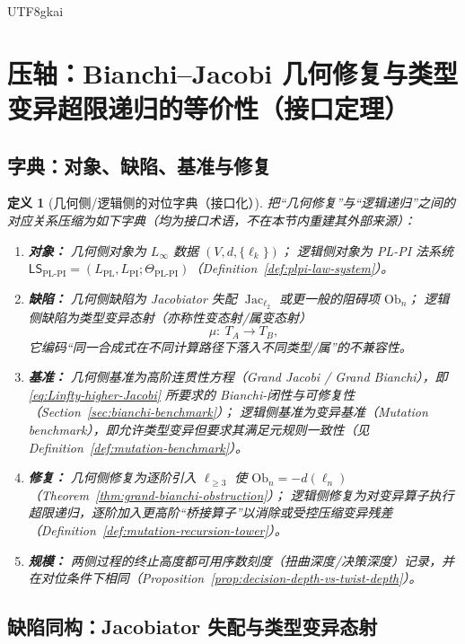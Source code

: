 \documentclass[12pt]{article}
\newtheorem{definition}{定义}[section]
\newcommand{\Layer}{\ensuremath{\ell}}
\newcommand{\Jac}{\operatorname{Jac}}
\newcommand{\Ob}{\mathrm{Ob}}
\newcommand{\LSPLPI}{\ensuremath{\mathsf{LS}_{\mathrm{PL\text{-}PI}}}}
\newcommand{\LPL}{\ensuremath{L_{\mathrm{PL}}}}
\newcommand{\LPI}{\ensuremath{L_{\mathrm{PI}}}}
\newcommand{\ThetaPLPI}{\ensuremath{\Theta_{\mathrm{PL\text{-}PI}}}}
\begin{document}
\begin{CJK*}{UTF8}{gkai}
\section{压轴：Bianchi--Jacobi 几何修复与类型变异超限递归的等价性（接口定理）}
\label{sec:bianchi-mutation-equivalence}

\subsection{字典：对象、缺陷、基准与修复}

\begin{definition}[几何侧/逻辑侧的对位字典（接口化）]
\label{def:geo-logic-dictionary}
把“几何修复”与“逻辑递归”之间的对应关系压缩为如下字典（均为接口术语，不在本节内重建其外部来源）：
\begin{enumerate}
  \item \textbf{对象：}
        几何侧对象为 $L_\infty$ 数据 $(V,d,\{\Layer_k\})$；
        逻辑侧对象为 PL-PI 法系统 $\LSPLPI=(\LPL,\LPI;\ThetaPLPI)$（Definition~\ref{def:plpi-law-system}）。
  \item \textbf{缺陷：}
        几何侧缺陷为 Jacobiator 失配 $\Jac_{\Layer_2}$ 或更一般的阻碍项 $\Ob_n$；
        逻辑侧缺陷为\emph{类型变异态射}（亦称性变态射/属变态射）
        \[
          \mu:\ T_A\longrightarrow T_B,
        \]
        它编码“同一合成式在不同计算路径下落入不同类型/属”的不兼容性。
  \item \textbf{基准：}
        几何侧基准为高阶连贯性方程（Grand Jacobi / Grand Bianchi），即 \eqref{eq:Linfty-higher-Jacobi}
        所要求的 Bianchi-闭性与可修复性（Section~\ref{sec:bianchi-benchmark}）；
        逻辑侧基准为\emph{变异基准}（Mutation benchmark），即允许类型变异但要求其满足元规则一致性（见 Definition~\ref{def:mutation-benchmark}）。
  \item \textbf{修复：}
        几何侧修复为逐阶引入 $\Layer_{\ge 3}$ 使 $\Ob_n=-d(\Layer_n)$（Theorem~\ref{thm:grand-bianchi-obstruction}）；
        逻辑侧修复为对变异算子执行超限递归，逐阶加入更高阶“桥接算子”以消除或受控压缩变异残差（Definition~\ref{def:mutation-recursion-tower}）。
  \item \textbf{规模：}
        两侧过程的终止高度都可用序数刻度（扭曲深度/决策深度）记录，并在对位条件下相同（Proposition~\ref{prop:decision-depth-vs-twist-depth}）。
\end{enumerate}
\end{definition}

\subsection{缺陷同构：Jacobiator 失配与类型变异态射}


\end{CJK*}
\end{document}
